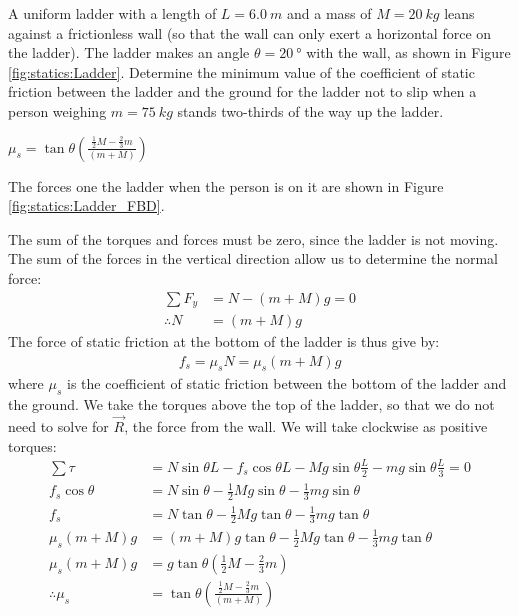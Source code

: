 \question A uniform ladder with a length of $L=\SI{6.0}{m}$ and a mass of $M=\SI{20}{kg}$ leans against a frictionless wall (so that the wall can only exert a horizontal force on the ladder). The ladder makes an angle $\theta=\SI{20}{\degree}$ with the wall, as shown in Figure \ref{fig:statics:Ladder}. Determine the minimum value of the coefficient of static friction between the ladder and the ground for the ladder not to slip when a person weighing $m=\SI{75}{kg}$ stands two-thirds of the way up the ladder.
\begin{finalanswer}
$\mu_s =\tan\theta\left(\frac{\frac{1}{2}M-\frac{2}{3}m}{(m+M)}  \right)$
\end{finalanswer}
\begin{solution}
The forces one the ladder when the person is on it are shown in Figure \ref{fig:statics:Ladder_FBD}.

The sum of the torques and forces must be zero, since the ladder is not moving. The sum of the forces in the vertical direction allow us to determine the normal force:
\begin{align*}
\sum F_y&=N-(m+M)g=0\\
\therefore N&=(m+M)g
\end{align*}
The force of static friction at the bottom of the ladder is thus give by:
\begin{align*}
f_s=\mu_sN=\mu_s(m+M)g
\end{align*}
where $\mu_s$ is the coefficient of static friction between the bottom of the ladder and the ground. We take the torques above the top of the ladder, so that we do not need to solve for $\vec R$, the force from the wall. We will take clockwise as positive torques:
\begin{align*}
\sum\tau&=N\sin\theta L-f_s\cos\theta L-Mg\sin\theta\frac{L}{2}-mg\sin\theta\frac{L}{3}=0\\
f_s\cos\theta&=N\sin\theta-\frac{1}{2}Mg\sin\theta-\frac{1}{3}mg\sin\theta\\
f_s&=N\tan\theta-\frac{1}{2}Mg\tan\theta-\frac{1}{3}mg\tan\theta\\
\mu_s(m+M)g &=(m+M)g\tan\theta-\frac{1}{2}Mg\tan\theta-\frac{1}{3}mg\tan\theta\\
\mu_s(m+M)g &=g\tan\theta\left(\frac{1}{2}M-\frac{2}{3}m  \right) \\
\therefore \mu_s &=\tan\theta\left(\frac{\frac{1}{2}M-\frac{2}{3}m}{(m+M)}  \right) \\
\end{align*}
\end{solution}


